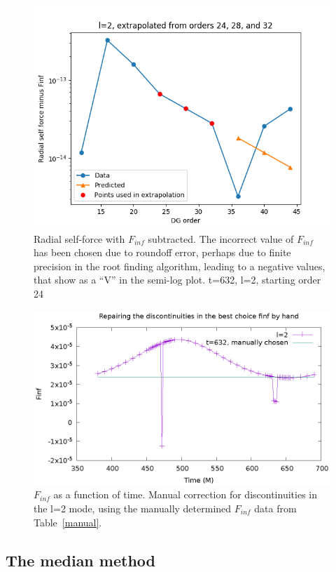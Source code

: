 \begin{figure}
  \includegraphics{extrapolate7t632l2i3}
  \caption{Radial self-force with $F_{inf}$ subtracted. The incorrect value of $F_{inf}$ has been chosen due to roundoff error, perhaps due to finite precision in the root finding algorithm, leading to a negative values, that show as a ``V'' in the semi-log plot. t=632, l=2, starting order 24}
  \label{offset}
\end{figure}


\begin{figure}
  \includegraphics{bestFinfManuallyChosent632l2}
\caption{$F_{inf}$ as a function of time. Manual correction for discontinuities in the l=2 mode, using the manually determined $F_{inf}$ data from Table~\ref{manual}. }
\label{manualfix}          
\end{figure}

\subsection{The median method}

